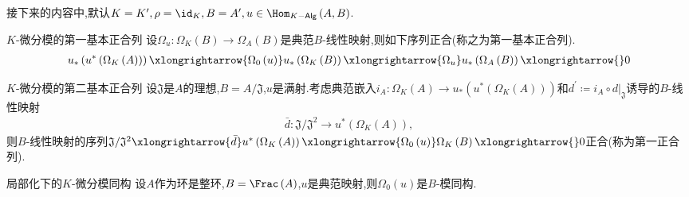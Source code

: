 接下来的内容中,默认$K=K^{\prime},\rho=\id_{K},B=A^{\prime},u\in\Hom_{K-\mathsf{Alg}}\left(A,B\right)$.

\begin{proposition}{$K$-微分模的第一基本正合列}{}
	设$\Omega_{u}:\Omega_{K}\left(B\right)\to\Omega_{A}\left(B\right)$是典范$B$-线性映射,则如下序列正合(称之为第一基本正合列).
	\begin{align*}
		u_{\ast}\left(u^{\ast}\left(\Omega_{K}\left(A\right)\right)\right)\xlongrightarrow{\Omega_{0}\left(u\right)}u_{\ast}\left(\Omega_{K}\left(B\right)\right)\xlongrightarrow{\Omega_{u}}u_{\ast}\left(\Omega_{A}\left(B\right)\right)\xlongrightarrow{}0
	\end{align*}
\end{proposition}

\begin{proposition}{$K$-微分模的第二基本正合列}{}
	设$\mathfrak{J}$是$A$的理想,$B=A/\mathfrak{J}$,$u$是满射.考虑典范嵌入$i_{A}:\Omega_{K}\left(A\right)\to u_{\ast}\left(u^{\ast}\left(\Omega_{K}\left(A\right)\right)\right)$和$d^{\prime}\coloneq i_{A}\circ d|_{\mathfrak{J}}$诱导的$B$-线性映射
	\begin{align*}
		\bar{d}:\mathfrak{J}/\mathfrak{J}^{2}\to u^{\ast}\left(\Omega_{K}\left(A\right)\right),
	\end{align*}
	则$B$-线性映射的序列$\mathfrak{J}/\mathfrak{J}^{2}\xlongrightarrow{\bar{d}}u^{\ast}\left(\Omega_{K}\left(A\right)\right)\xlongrightarrow{\Omega_{0}\left(u\right)}\Omega_{K}\left(B\right)\xlongrightarrow{}0$正合(称为第一正合列).
\end{proposition}

\begin{proposition}{局部化下的$K$-微分模同构}{}
	设$A$作为环是整环,$B=\Frac\left(A\right)$,$u$是典范映射,则$\Omega_{0}\left(u\right)$是$B$-模同构.
\end{proposition}


























